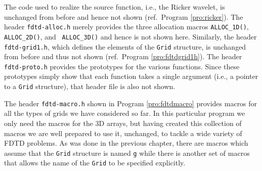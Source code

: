 The code used to realize the source function, i.e., the Ricker
wavelet, is unchanged from before and hence not shown (ref.\ Program
\ref{pro:ricker}).  The header {\tt fdtd-alloc.h} merely provides the
three allocation macros {\tt ALLOC\_1D()}, {\tt ALLOC\_2D()}, and {\tt
  ALLOC\_3D()} and hence is not shown here.  Similarly, the header
{\tt fdtd-grid1.h}, which defines the elements of the {\tt Grid}
structure, is unchanged from before and thus not shown (ref.\ Program
\ref{pro:fdtdgrid1h}).  The header {\tt fdtd-proto.h} provides the
prototypes for the various functions.  Since these prototypes simply
show that each function takes a single argument (i.e., a pointer to a
{\tt Grid} structure), that header file is also not shown.

The header {\tt fdtd-macro.h} shown in Program \ref{pro:fdtdmacro}
provides macros for all the types of grids we have considered so far.
In this particular program we only need the macros for the 3D arrays,
but having created this collection of macros we are well prepared to
use it, unchanged, to tackle a wide variety of FDTD problems.  As was
done in the previous chapter, there are macros which assume that the
{\tt Grid} structure is named {\tt g} while there is another set of
macros that allows the name of the {\tt Grid} to be specified
explicitly.

